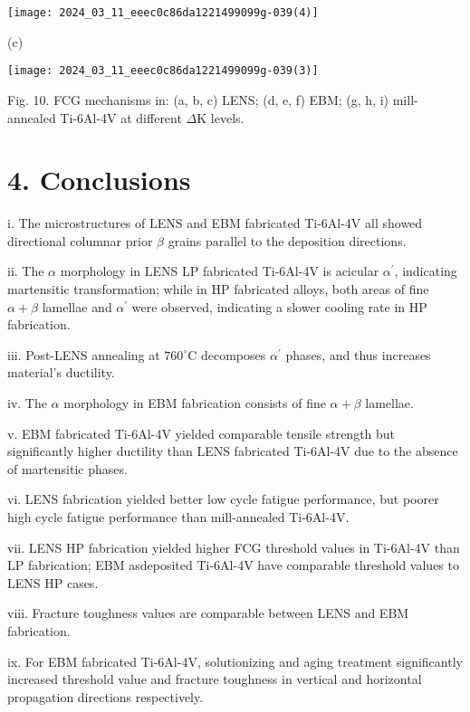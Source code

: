 \documentclass[10pt]{article}
\begin{document}
\begin{center}
\texttt{[image: 2024\_03\_11\_eeec0c86da1221499099g-039(4)]}
\end{center}

(c)

\begin{center}
\texttt{[image: 2024\_03\_11\_eeec0c86da1221499099g-039(3)]}
\end{center}

Fig. 10. FCG mechanisms in: (a, b, c) LENS; (d, e, f) EBM; (g, h, i) mill-annealed Ti-6Al-4V at different $\Delta \mathrm{K}$ levels.

\section*{4. Conclusions}
i. The microstructures of LENS and EBM fabricated Ti-6Al-4V all showed directional columnar prior $\beta$ grains parallel to the deposition directions.

ii. The $\alpha$ morphology in LENS LP fabricated Ti-6Al-4V is acicular $\alpha^{\prime}$, indicating martensitic transformation; while in HP fabricated alloys, both areas of fine $\alpha+\beta$ lamellae and $\alpha^{\prime}$ were observed, indicating a slower cooling rate in HP fabrication.

iii. Post-LENS annealing at $760^{\circ} \mathrm{C}$ decomposes $\alpha^{\prime}$ phases, and thus increases material's ductility.

iv. The $\alpha$ morphology in EBM fabrication consists of fine $\alpha+\beta$ lamellae.

v. EBM fabricated Ti-6Al-4V yielded comparable tensile strength but significantly higher ductility than LENS fabricated Ti-6Al-4V due to the absence of martensitic phases.

vi. LENS fabrication yielded better low cycle fatigue performance, but poorer high cycle fatigue performance than mill-annealed Ti-6Al-4V.

vii. LENS HP fabrication yielded higher FCG threshold values in Ti-6Al-4V than LP fabrication; EBM asdeposited Ti-6Al-4V have comparable threshold values to LENS HP cases.

viii. Fracture toughness values are comparable between LENS and EBM fabrication.

ix. For EBM fabricated Ti-6Al-4V, solutionizing and aging treatment significantly increased threshold value and fracture toughness in vertical and horizontal propagation directions respectively.
\end{document}
